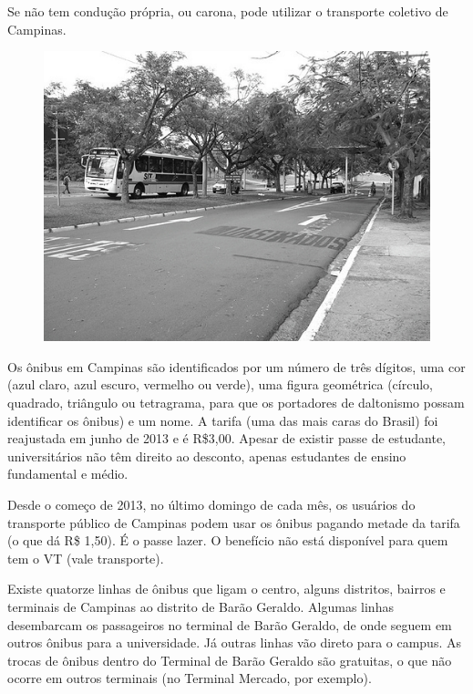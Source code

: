 Se não tem condução própria, ou carona, pode utilizar o transporte coletivo de
Campinas.

\begin{figure}[h!]
    \centering
    \includegraphics[scale=0.58,keepaspectratio=true]{img/imgs/8-transporte/-085.jpg}
\end{figure}

Os ônibus em Campinas são identificados por um número de três dígitos, uma cor
(azul claro, azul escuro, vermelho ou verde), uma figura geométrica (círculo,
quadrado, triângulo ou tetragrama, para que os portadores de daltonismo possam
identificar os ônibus) e um nome. A tarifa (uma das mais caras do Brasil) foi
reajustada em junho de 2013 e é R\$3,00. Apesar de existir passe de estudante,
universitários não têm direito ao desconto, apenas estudantes de ensino
fundamental e médio.

Desde o começo de 2013, no último domingo de cada mês, os usuários do transporte 
público de Campinas podem usar os ônibus pagando metade da tarifa (o que dá R\$ 1,50). 
É o passe lazer. O benefício não está disponível para quem tem o VT (vale transporte).

Existe quatorze linhas de ônibus que ligam o centro, alguns distritos, bairros e
terminais de Campinas ao distrito de Barão Geraldo. Algumas linhas desembarcam
os passageiros no terminal de Barão Geraldo, de onde seguem em outros ônibus
para a universidade. Já outras linhas vão direto para o campus. As trocas de
ônibus dentro do Terminal de Barão Geraldo são gratuitas, o que não ocorre em
outros terminais (no Terminal Mercado, por exemplo).

